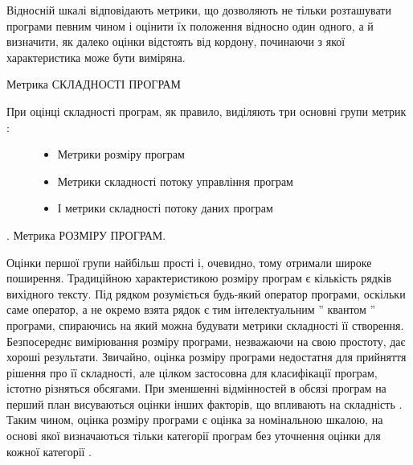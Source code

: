 Відносній шкалі відповідають метрики, що дозволяють не тільки розташувати програми певним чином і оцінити їх положення відносно один одного, а й визначити, як далеко оцінки відстоять від кордону, починаючи з якої характеристика може бути виміряна.

Метрика СКЛАДНОСТІ ПРОГРАМ
\begin{description}
\item[{При оцінці складності програм, як правило, виділяють три основні групи метрик :}] \leavevmode\begin{itemize}
\item {} 
Метрики розміру програм

\item {} 
Метрики складності потоку управління програм

\item {} 
І метрики складності потоку даних програм

\end{itemize}

\end{description}

.
Метрика РОЗМІРУ ПРОГРАМ.

Оцінки першої групи найбільш прості і, очевидно, тому отримали широке поширення. Традиційною характеристикою розміру програм є кількість рядків вихідного тексту. Під рядком розуміється будь-який оператор програми, оскільки саме оператор, а не окремо взята рядок є тим інтелектуальним '' квантом '' програми, спираючись на який можна будувати метрики складності її створення.
Безпосереднє вимірювання розміру програми, незважаючи на свою простоту, дає хороші результати. Звичайно, оцінка розміру програми недостатня для прийняття рішення про її складності, але цілком застосовна для класифікації програм, істотно різняться обсягами. При зменшенні відмінностей в обсязі програм на перший план висуваються оцінки інших факторів, що впливають на складність . Таким чином, оцінка розміру програми є оцінка за номінальною шкалою, на основі якої визначаються тільки категорії програм без уточнення оцінки для кожної категорії .

